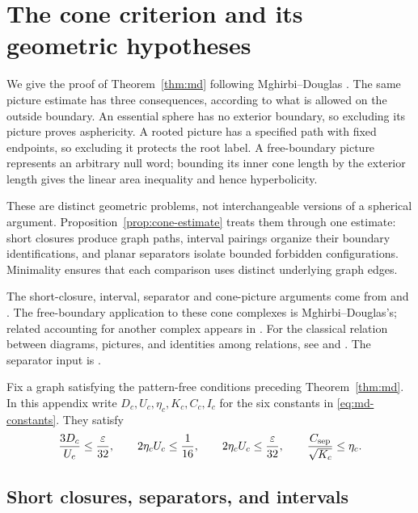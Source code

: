 \section{The cone criterion and its geometric hypotheses}\label{app:cones}
We give the proof of Theorem~\ref{thm:md} following Mghirbi--Douglas \cite[Sections~3--4]{MD26}. The same picture estimate has three consequences, according to what is allowed on the outside boundary. An essential sphere has no exterior boundary, so excluding its picture proves asphericity. A rooted picture has a specified path with fixed endpoints, so excluding it protects the root label. A free-boundary picture represents an arbitrary null word; bounding its inner cone length by the exterior length gives the linear area inequality and hence hyperbolicity.

These are distinct geometric problems, not interchangeable versions of a spherical argument. Proposition~\ref{prop:cone-estimate} treats them through one estimate: short closures produce graph paths, interval pairings organize their boundary identifications, and planar separators isolate bounded forbidden configurations. Minimality ensures that each comparison uses distinct underlying graph edges.

The short-closure, interval, separator and cone-picture arguments come from \cite[Sections~4--5]{OAI196} and \cite[Sections~5--6]{OAI197a}. The free-boundary application to these cone complexes is Mghirbi--Douglas's; related accounting for another complex appears in \cite[Theorem~3.1 and Lemma~3.8]{OAI257}. For the classical relation between diagrams, pictures, and identities among relations, see \cite[Chapter~V]{LS77} and \cite{CH82,BP93}. The separator input is \cite{LT79}.

Fix a graph satisfying the pattern-free conditions preceding Theorem~\ref{thm:md}. In this appendix write $D_c,U_c,\eta_c,K_c,C_c,I_c$ for the six constants in \eqref{eq:md-constants}. They satisfy
\begin{equation}\label{eq:cone-inequalities}
 \frac{3D_c}{U_c}\le\frac\varepsilon{32},\qquad
 2\eta_cU_c\le\frac1{16},\qquad
 2\eta_cU_c\le\frac\varepsilon{32},\qquad
 \frac{C_{\rm sep}}{\sqrt{K_c}}\le\eta_c.
\end{equation}

\subsection{Short closures, separators, and intervals}

